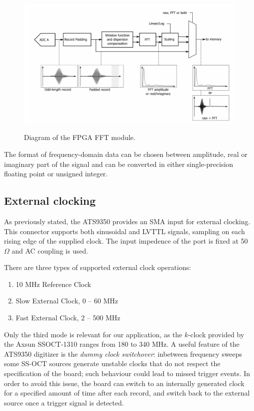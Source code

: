     \begin{figure}[bth]
    	\myfloatalign
    	{\includegraphics[width=.95\linewidth]{gfx/ch3/fft-module}}
    	\caption{Diagram of the FPGA FFT module.}\label{fig:fft-module}
    \end{figure}
    
    The format of frequency-domain data can be chosen between amplitude, real or imaginary part of the signal and can be converted in either single-precision floating point or unsigned integer. 
    
    \subsection{External clocking}
    As previously stated, the ATS9350 provides an SMA input for external clocking. This connector supports both sinusoidal and \ac{LVTTL} signals, sampling on each rising edge of the supplied clock. The input impedence of the port is fixed at 50 $\Omega$ and AC coupling is used.
    
    There are three types of supported external clock operations:
    \begin{enumerate}
    	\item 10 MHz Reference Clock
    	\item Slow External Clock, 0 -- 60 MHz
    	\item Fast External Clock, 2 -- 500 MHz
    \end{enumerate} 

	Only the third mode is relevant for our application, as the $k$-clock provided by the Axsun SSOCT-1310 ranges from 180 to 340 MHz. A useful feature of the ATS9350 digitizer is the \emph{dummy clock switchover}: inbetween frequency sweeps some SS-OCT sources generate unstable clocks that do not respect the specification of the board; such behaviour could lead to missed trigger events. In order to avoid this issue, the board can switch to an internally generated clock for a specified amount of time after each record, and switch back to the external source once a trigger signal is detected. 
	
